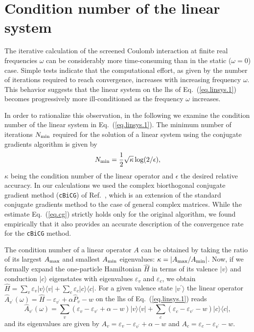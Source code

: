 \documentclass[twocolumn,prb,showpacs,superscriptaddress]{revtex4}
\def\w{\omega}
\def\>{\rangle}
\def\<{\langle}
\def\H{\hat{H}}
\def\E{\varepsilon}
\def\vp{{v^\prime}}
\begin{document}
\section{Condition number of the linear system}

The iterative calculation of the screened Coulomb interaction at finite real
frequencies $\w$ can be considerably more time-consuming than in the static
($\w=0$) case. Simple tests indicate that the computational effort, as given
by the number of iterations required to reach convergence, increases with 
increasing frequency $\w$. This behavior suggests that the linear system 
on the lhs of Eq.\ (\ref{eq.linsys.1}) becomes progressively more ill-conditioned 
as the frequency $\w$ increases.

In order to rationalize this observation, in the following we examine
the condition number of the linear system in Eq.\ (\ref{eq.linsys.1}).
The minimum number of iterations $N_{\rm min}$ required for the solution of
a linear system using the conjugate gradients algorithm is given by
  \begin{equation}\label{eq.cg}
  N_{\rm min} = \frac{1}{2}\sqrt{\kappa} \log(2/\epsilon),
  \end{equation}
$\kappa$ being the condition number of the linear operator and $\epsilon$ the
desired relative accuracy.\cite{painless.cg} In our calculations we used the 
complex biorthogonal conjugate gradient method ({\tt cBiCG}) of Ref.\ ,
which is an extension of the standard conjugate gradients method to the 
case of general complex matrices. While the estimate Eq.\ (\ref{eq.cg}) strictly 
holds only for the original algorithm, we found empirically that it also 
provides an accurate description of the convergence rate for the {\tt cBiCG} 
method.

The condition number of a linear operator $A$ can be obtained by taking the ratio 
of its largest $A_{\rm max}$ and smallest $A_{\rm min}$ eigenvalues: 
$\kappa=|A_{\rm max}/A_{\rm min}|$.
Now, if we formally expand the one-particle Hamiltonian $\H$ in terms of its valence 
$|v\>$ and conduction $|c\>$ eigenstates with eigenvalues $\E_v$ and $\E_c$, we obtain
$\H = \sum_v \E_v |v\>\<v| + \sum_c \E_c |c\>\<c|$. For a given valence state 
$|v^\prime\>$ the linear operator $\hat{A}_\vp (\w) = \H - \E_\vp + \alpha \hat{P}_v - w$ 
on the lhs of Eq.\ (\ref{eq.linsys.1}) reads
  \begin{equation}
  \hat{A}_\vp (\w)  = 
  \sum_v ( \E_v - \E_\vp + \alpha - w ) |v\>\<v| 
  + \sum_c ( \E_c - \E_\vp - w ) |c\>\<c|,
  \end{equation}
and its eigenvalues are given by $A_v = \E_v - \E_\vp + \alpha - w$ and
$A_c = \E_c - \E_\vp - w$. 
\end{document}
